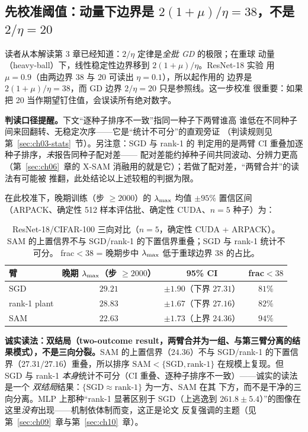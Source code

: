 \subsection{先校准阈值：动量下边界是 $2(1+\mu)/\eta=38$，不是 $2/\eta=20$}\label{sec:ch08-threeway}

读者从本解读第 3 章已经知道：$2/\eta$ 定律是\emph{全批 GD} 的极限；在重球
动量（heavy-ball）下，线性稳定性边界移到 $2(1+\mu)/\eta$。ResNet-18 实验
用 $\mu=0.9$（由两边界 $38$ 与 $20$ 可读出 $\eta=0.1$），所以起作用的
边界是 $2(1+\mu)/\eta=38$，而 GD 边界 $2/\eta=20$ 只是参照线。这一步校准
很重要：如果把 20 当作期望钉住值，会误读所有绝对数字。

\textbf{判读口径提醒。}下文``逐种子排序不一致''指同一种子下两臂谁高
谁低在不同种子间来回翻转、无稳定次序——它是``统计不可分''的直观旁证
（判读规则见第~\ref{sec:ch03-stats}~节）。另注意：SGD 与 rank-1 的
判定用的是两臂 CI 重叠加逐种子排序，\emph{未}报告同种子配对差——
配对差能约掉种子间共同波动、分辨力更高（第~\ref{sec:ch06}~章的
X-SAM 消融用的就是它）；若做了配对差，``两臂合并''的读法有可能被
推翻，此处结论以上述较粗的判据为限。

在此校准下，晚期训练（步 $\ge2000$）的 $\lambda_{\max}$ 均值 $\pm95\%$ 置信区间
（ARPACK、确定性 512 样本评估批、确定性 CUDA、$n=5$ 种子）为：

\begin{table}[!ht]
\centering
\begin{tabular}{lccc}
\toprule
臂 & 晚期 $\lambda_{\max}$（步 $\ge2000$） & 95\% CI & frac${}<38$ \\
\midrule
SGD & $29.21$ & $\pm1.90$（下界 $27.31$） & $81\%$ \\
rank-1 plant & $28.83$ & $\pm1.67$（下界 $27.16$） & $82\%$ \\
SAM & $22.63$ & $\pm1.73$（上界 $24.36$） & $94\%$ \\
\bottomrule
\end{tabular}
\caption{ResNet-18/CIFAR-100 三向对比（$n=5$，确定性 CUDA + ARPACK）。
SAM 的上置信界不与 SGD/rank-1 的下置信界重叠；SGD 与 rank-1 统计不可分。
frac${}<38$ = 晚期步中 $\lambda_{\max}$ 低于重球边界 $38$ 的占比。}
\label{tab:ch08-threeway}
\end{table}

\textbf{诚实读法：双结局（two-outcome result，两臂合并为一组、与第三臂分离的结果模式），不是三向分裂。}SAM 的上置信界（$24.36$）不与
SGD/rank-1 的下置信界（$27.31/27.16$）重叠，所以排序
$\text{SAM}<\{\text{SGD},\text{rank-1}\}$ 在规模上复现。但 SGD 与 rank-1
\emph{本身}统计不可分（CI 重叠、逐种子排序不一致）——诚实的读法是一个
\emph{双结局}结果：$\{\text{SGD}\approx\text{rank-1}\}$ 为一方、SAM 在其
下方，而不是干净的三向分离。MLP 上那种“rank-1 显著区别于 SGD（上逃逸到
$261.8\pm5.4$）”的图像在这里\emph{没有}出现——机制依体制而变，这正是论文
反复强调的主题（见第~\ref{sec:ch09}~章与第~\ref{sec:ch10}~章）。

